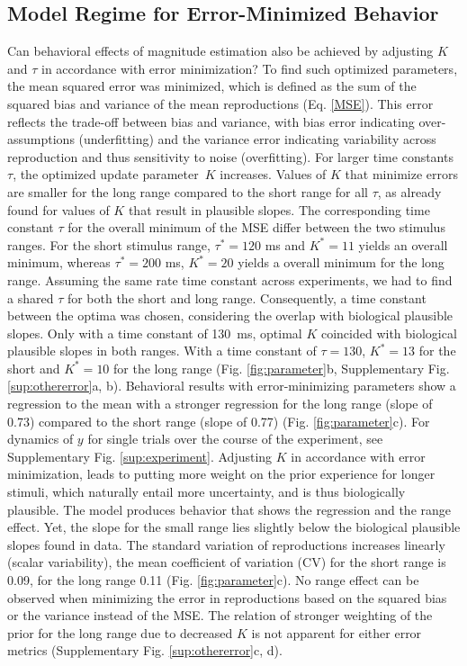 \documentclass[10pt]{article}
\begin{document}
\subsection{Model Regime for Error-Minimized Behavior} 
Can behavioral effects of magnitude estimation also be achieved by adjusting $K$ and $\tau$ in accordance with error minimization?
To find such optimized parameters, the mean squared error was minimized, which is defined as the sum of the squared bias and variance of the mean reproductions 
(Eq. \ref{MSE}). This error reflects the trade-off between bias and variance, with bias error indicating over-assumptions (underfitting) and the variance error indicating variability across reproduction and thus sensitivity to noise (overfitting).
For larger time constants~$\tau$, the optimized update parameter~$K$ increases. Values of $K$ that minimize errors are smaller for the long range compared to the short range for all $\tau$, as already found for values of $K$ that result in plausible slopes.
The corresponding time constant $\tau$ for the overall minimum of the MSE differ between the two stimulus ranges. For the short stimulus range, $\tau^* = 120$ ms and $K^* = 11$ yields an overall minimum, whereas $\tau^* = 200$ ms, $K^* = 20$ yields a overall minimum for the long range. 
Assuming the same rate time constant across experiments, we had to find a shared $\tau$ for both the short and long range. Consequently, a time constant between the optima was chosen, considering the overlap with biological plausible slopes. Only with a time constant of 130~ms, optimal $K$ coincided with biological plausible slopes in both ranges. 
With a time constant of $\tau = 130$, $K^* = 13$ for the short and $K^* = 10$ for the long range (Fig. \ref{fig:parameter}b, Supplementary Fig. \ref{sup:othererror}a, b).
Behavioral results with error-minimizing parameters show a regression to the mean with a stronger regression for the long range (slope of 0.73) compared to the short range (slope of 0.77) (Fig. \ref{fig:parameter}c). For dynamics of $y$ for single trials over the course of the experiment, see Supplementary Fig. \ref{sup:experiment}.
Adjusting $K$ in accordance with error minimization, leads to putting more weight on the prior experience for longer stimuli, which naturally entail more uncertainty, and is thus biologically plausible.
The model produces behavior that shows the regression and the range effect.
Yet, the slope for the small range lies slightly below the biological plausible slopes found in data. 
The standard variation of reproductions increases linearly (scalar variability), the mean coefficient of variation (CV) for the short range is 0.09, for the long range 0.11 (Fig. \ref{fig:parameter}c).
No range effect can be observed when minimizing the error in reproductions based on the squared bias or the variance instead of the MSE. The relation of stronger weighting of the prior for the long range due to decreased $K$ is not apparent for either error metrics (Supplementary Fig. \ref{sup:othererror}c, d).  
\end{document}
